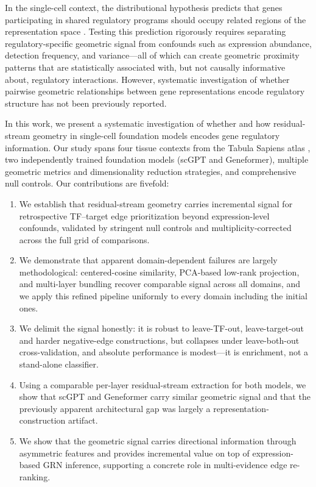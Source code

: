 \documentclass[11pt]{article}
\begin{document}
In the single-cell context, the distributional hypothesis predicts that genes participating in shared regulatory programs should occupy related regions of the representation space \cite{mikolov2013distributed}.
Testing this prediction rigorously requires separating regulatory-specific geometric signal from confounds such as expression abundance, detection frequency, and variance---all of which can create geometric proximity patterns that are statistically associated with, but not causally informative about, regulatory interactions.
However, systematic investigation of whether pairwise geometric relationships between gene representations encode regulatory structure has not been previously reported.

In this work, we present a systematic investigation of whether and how residual-stream geometry in single-cell foundation models encodes gene regulatory information.
Our study spans four tissue contexts from the Tabula Sapiens atlas \cite{tabulasapiens2022}, two independently trained foundation models (scGPT and Geneformer), multiple geometric metrics and dimensionality reduction strategies, and comprehensive null controls.
Our contributions are fivefold:
\begin{enumerate}[leftmargin=2em]
    \item We establish that residual-stream geometry carries incremental signal for retrospective TF--target edge prioritization beyond expression-level confounds, validated by stringent null controls and multiplicity-corrected across the full grid of comparisons.
    \item We demonstrate that apparent domain-dependent failures are largely methodological: centered-cosine similarity, PCA-based low-rank projection, and multi-layer bundling recover comparable signal across all domains, and we apply this refined pipeline uniformly to every domain including the initial ones.
    \item We delimit the signal honestly: it is robust to leave-TF-out, leave-target-out and harder negative-edge constructions, but collapses under leave-both-out cross-validation, and absolute performance is modest---it is enrichment, not a stand-alone classifier.
    \item Using a comparable per-layer residual-stream extraction for both models, we show that scGPT and Geneformer carry similar geometric signal and that the previously apparent architectural gap was largely a representation-construction artifact.
    \item We show that the geometric signal carries directional information through asymmetric features and provides incremental value on top of expression-based GRN inference, supporting a concrete role in multi-evidence edge re-ranking.
\end{enumerate}
\end{document}
